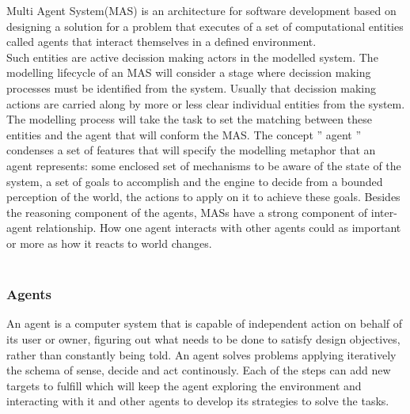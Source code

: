 \documentclass{report}
\begin{document}
Multi Agent System(MAS) is an architecture for software development based on designing a solution for a problem that 
executes of a set of computational entities called agents that interact themselves in a defined environment.\\
Such entities are active decission making actors in the modelled system. The modelling lifecycle of an MAS will consider a stage where decission making processes must be identified from the system. Usually that decission making 
actions are carried along by more or less clear individual entities from the system. The modelling process will take the task to set the matching between these entities and the agent that will conform the MAS. The concept 
'' agent '' condenses a set of features that will specify the modelling metaphor that an agent represents:
some enclosed set of mechanisms to be aware of the state of the system, a set of goals to accomplish and the engine to decide from a bounded perception of the world, the actions to apply on it to achieve these goals. Besides the reasoning component of the agents, MASs have a strong component of inter-agent relationship. How one agent interacts with other agents could as important or more as how it reacts to world changes.
\\
\\

\subsubsection{Agents}



An agent is a computer system that is capable of independent action on behalf of its user or owner,
figuring out what needs to be done to satisfy design objectives, rather than constantly being told.
An agent solves problems applying iteratively the schema of sense, decide and act continously. Each
of the steps can add new targets to fulfill which will keep the agent exploring the environment and 
interacting with it and other agents to develop its strategies to solve the tasks.
\end{document}

